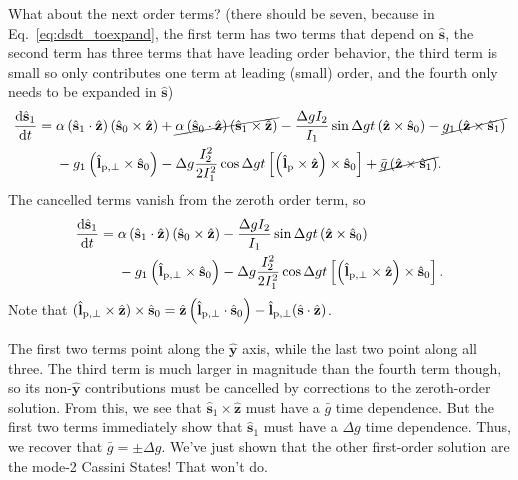 \documentclass[12pt]{article}
\newcommand*{\rd}[2]{\frac{\mathrm{d}#1}{\mathrm{d}#2}}
\newcommand*{\bm}[1]{\boldsymbol{\mathbf{#1}}}
\newcommand*{\uv}[1]{\hat{\bm{#1}}}
\newcommand*{\p}[1]{\left(#1\right)}
\newcommand*{\s}[1]{\left[#1\right]}
\begin{document}
What about the next order terms?
(there should be seven, because in Eq.~\ref{eq:dsdt_toexpand}, the first term
has two terms that depend on $\uv{s}$, the second term has three terms that have
leading order behavior, the third term is small so only contributes one term at
leading (small) order, and the fourth only needs to be expanded in $\uv{s}$)
\begin{align}
    \rd{\uv{s}_1}{t}
        ={}&
            \alpha\p{\uv{s}_1 \cdot \uv{z}}
                \p{\uv{s}_0 \times \uv{z}}
            + \cancel{\alpha\p{\uv{s}_0 \cdot \uv{z}}
                \p{\uv{s}_1 \times \uv{z}}}
                - \frac{\Delta gI_2}{I_1}\sin\Delta g t
                    \p{\uv{z} \times \uv{s}_0}
                - \cancel{g_1\p{\uv{z} \times \uv{s}_1}}\nonumber\\
            &- g_1\p{\uv{l}_{\rm p, \perp} \times \uv{s}_0}
                - \Delta g\frac{I_2^2}{2I_1^2}\cos\Delta gt
                    \s{\p{\uv{l}_{\rm p} \times \uv{z}} \times \uv{s}_0}
                + \cancel{\bar{g}\p{\uv{z} \times \uv{s}_1}}.
\end{align}
The cancelled terms vanish from the zeroth order term, so
\begin{align}
    \rd{\uv{s}_1}{t}
        ={}&
            \alpha\p{\uv{s}_1 \cdot \uv{z}}
                \p{\uv{s}_0 \times \uv{z}}
                - \frac{\Delta gI_2}{I_1}\sin\Delta g t
                    \p{\uv{z} \times \uv{s}_0}\nonumber\\
            &- g_1\p{\uv{l}_{\rm p, \perp} \times \uv{s}_0}
                - \Delta g\frac{I_2^2}{2I_1^2}\cos\Delta gt
                    \s{\p{\uv{l}_{\rm p, \perp} \times \uv{z}} \times \uv{s}_0}.
\end{align}
Note that $(\uv{l}_{\rm p, \perp} \times \uv{z}) \times \uv{s}_0 =
\uv{z}\p{\uv{l}_{\rm p, \perp} \cdot \uv{s}_0} - \uv{l}_{\rm p, \perp}(\uv{s}
\cdot \uv{z})$.

The first two terms point along the $\uv{y}$ axis, while the last two point
along all three.
The third term is much larger in magnitude than the fourth term though, so its
non-$\uv{y}$ contributions must be cancelled by corrections to the zeroth-order
solution.
From this, we see that $\uv{s}_1 \times \uv{z}$ must have a $\bar{g}$ time
dependence.
But the first two terms immediately show that $\uv{s}_1$ must have a $\Delta g$
time dependence.
Thus, we recover that $\bar{g} = \pm \Delta g$.
We've just shown that the other first-order solution are the mode-2 Cassini
States!
That won't do.
\end{document}
